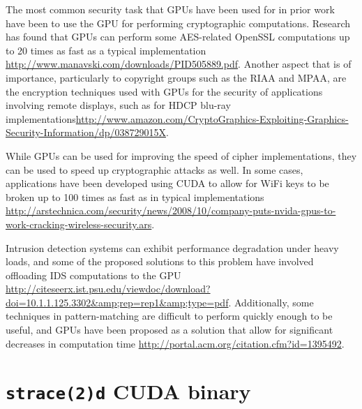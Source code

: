 \documentclass[letterpaper,10pt]{article}
\begin{document}
\begin{multicols}{2}
  The most common security task that GPUs have been used for in prior work have been to use the GPU for performing cryptographic computations. Research has found that GPUs can perform some AES-related OpenSSL computations up to 20 times as fast as a typical implementation
\url{http://www.manavski.com/downloads/PID505889.pdf}. Another aspect that is of importance, particularly to copyright groups such as the RIAA and MPAA, are the encryption techniques used with GPUs for the security of applications involving remote displays, such as for HDCP blu-ray implementations\url{http://www.amazon.com/CryptoGraphics-Exploiting-Graphics-Security-Information/dp/038729015X}.
  
  While GPUs can be used for improving the speed of cipher implementations, they can be used to speed up cryptographic attacks as well. In some cases, applications have been developed using CUDA to allow for WiFi keys to be broken up to 100 times as fast as in typical implementations \url{http://arstechnica.com/security/news/2008/10/company-puts-nvida-gpus-to-work-cracking-wireless-security.ars}.
  
  Intrusion detection systems can exhibit performance degradation under heavy
  loads, and some of the proposed solutions to this problem have involved
  offloading IDS computations to the GPU
  \url{http://citeseerx.ist.psu.edu/viewdoc/download?doi=10.1.1.125.3302&amp;rep=rep1&amp;type=pdf}.
  Additionally, some techniques in pattern-matching are difficult to perform
  quickly enough to be useful, and GPUs have been proposed as a solution that
  allow for significant decreases in computation time
  \url{http://portal.acm.org/citation.cfm?id=1395492}.



\end{multicols}
\appendix
\newpage
\section{\texttt{strace(2)d} CUDA binary}\label{strace}
\end{document}

